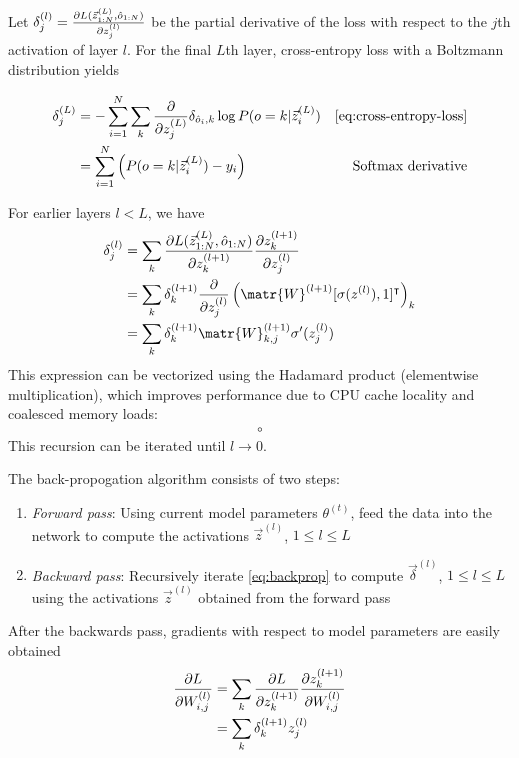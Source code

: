 Let $\delta^{(l)}_{j} = \frac{\partial L(\vec{z}^{(L)}_{1:N}, \hat{o}_{1:N})}{\partial
z^{(l)}_j}$ be the partial derivative of the loss with respect to the $j$th
activation of layer $l$. For the final $L$th layer, cross-entropy loss
with a Boltzmann distribution yields

\begin{align*}
    \delta^{(L)}_{j}
    &= - \sum_{i=1}^{N} \sum_{k} \frac{\pd}{\pd z^{(L)}_j} \delta_{\hat{o}_i,k} \log P(o=k | \vec{z}^{(L)}_i ) &\mbox{\autoref{eq:cross-entropy-loss}} \\
    &= \sum_{i=1}^{N} \left( P(o=k | \vec{z}^{(L)}_i ) - y_i \right) & \mbox{Softmax derivative}
\end{align*}

For earlier layers $l < L$, we have
\begin{align}
    \delta^{(l)}_{j}
    &= \sum_k \frac{\pd L(\vec{z}^{(L)}_{1:N}, \hat{o}_{1:N})}{\pd z^{(l+1)}_k}
    \frac{\pd z^{(l+1)}_k}{\pd z^{(l)}_j}\\
    &= \sum_k \delta^{(l+1)}_k
    \frac{\pd}{\pd z^{(l)}_j} \left( \matr{W}^{(l+1)} [\sigma(z^{(l)}), 1]^\tp \right)_k \\
    &= \sum_k \delta^{(l+1)}_k
    \matr{W}^{(l+1)}_{k,j} \sigma'(z^{(l)}_j) \label{eq:backprop}
\end{align}
This expression can be vectorized using the Hadamard product (elementwise multiplication), which
improves performance due to CPU cache locality and coalesced memory loads: 
\begin{align}
    \circ
\end{align}
This recursion can be iterated until $l \to 0$.

The back-propogation algorithm consists of two steps:
\begin{enumerate}
    \item \emph{Forward pass}: Using current model parameters $\theta^{(t)}$,
        feed the data into the network to compute the activations $\vec{z}^{(l)}$,
        $1 \leq l \leq L$
    \item \emph{Backward pass}: Recursively iterate \autoref{eq:backprop}
        to compute $\vec{\delta}^{(l)}$, $1 \leq l \leq L$ using the activations
        $\vec{z}^{(l)}$ obtained from the forward pass
\end{enumerate}

After the backwards pass, gradients with respect to model parameters are easily obtained
\begin{align}
    \frac{\partial L}{\partial W^{(l)}_{i,j} }
    &= \sum_k \frac{\partial L}{\partial z^{(l+1)}_k} \frac{\partial z^{(l+1)}_k}{\partial W^{(l)}_{i,j}} \\
    &= \sum_k \delta^{(l+1)}_k z^{(l)}_j
\end{align}

